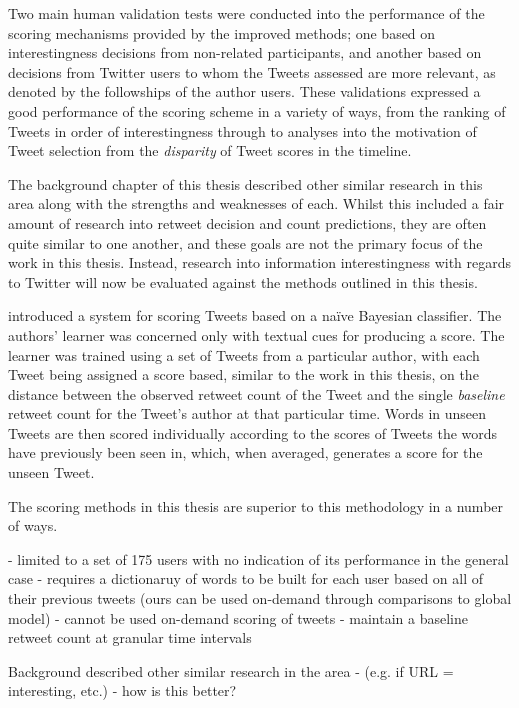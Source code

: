 Two main human validation tests were conducted into the performance of the scoring mechanisms provided by the improved methods; one based on interestingness decisions from non-related participants, and another based on decisions from Twitter users to whom the Tweets assessed are more relevant, as denoted by the followships of the author users. These validations expressed a good performance of the scoring scheme in a variety of ways, from the ranking of Tweets in order of interestingness through to analyses into the motivation of Tweet selection from the \textit{disparity} of Tweet scores in the timeline.

The background chapter of this thesis described other similar research in this area along with the strengths and weaknesses of each. Whilst this included a fair amount of research into retweet decision and count predictions, they are often quite similar to one another, and these goals are not the primary focus of the work in this thesis. Instead, research into information interestingness with regards to Twitter will now be evaluated against the methods outlined in this thesis.

\cite{gransee12} introduced a system for scoring Tweets based on a na{\"i}ve Bayesian classifier. The authors' learner was concerned only with textual cues for producing a score. The learner was trained using a set of Tweets from a particular author, with each Tweet being assigned a score based, similar to the work in this thesis, on the distance between the observed retweet count of the Tweet and the single \textit{baseline} retweet count for the Tweet's author at that particular time. Words in unseen Tweets are then scored individually according to the scores of Tweets the words have previously been seen in, which, when averaged, generates a score for the unseen Tweet.

The scoring methods in this thesis are superior to this methodology in a number of ways. 

- limited to a set of 175 users with no indication of its performance in the general case 
- requires a dictionaruy of words to be built for each user based on all of their previous tweets (ours can be used on-demand through comparisons to global model)
- cannot be used on-demand scoring of tweets
- maintain a baseline retweet count at granular time intervals



Background described other similar research in the area - (e.g. if URL = interesting, etc.) - how is this better?



